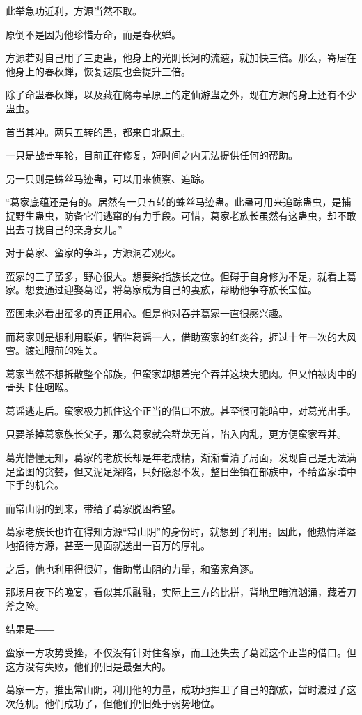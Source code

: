 \begin{this_body}
此举急功近利，方源当然不取。

原倒不是因为他珍惜寿命，而是春秋蝉。

方源若对自己用了三更蛊，他身上的光阴长河的流速，就加快三倍。那么，寄居在他身上的春秋蝉，恢复速度也会提升三倍。

除了命蛊春秋蝉，以及藏在腐毒草原上的定仙游蛊之外，现在方源的身上还有不少蛊虫。

首当其冲。两只五转的蛊，都来自北原土。

一只是战骨车轮，目前正在修复，短时间之内无法提供任何的帮助。

另一只则是蛛丝马迹蛊，可以用来侦察、追踪。

“葛家底蕴还是有的。居然有一只五转的蛛丝马迹蛊。此蛊可用来追踪蛊虫，是捕捉野生蛊虫，防备它们逃窜的有力手段。可惜，葛家老族长虽然有这蛊虫，却不敢出去寻找自己的亲身女儿。”

对于葛家、蛮家的争斗，方源洞若观火。

蛮家的三子蛮多，野心很大。想要染指族长之位。但碍于自身修为不足，就看上葛家。想要通过迎娶葛谣，将葛家成为自己的妻族，帮助他争夺族长宝位。

蛮图未必看出蛮多的真正用心。但是他对吞并葛家一直很感兴趣。

而葛家则是想利用联姻，牺牲葛谣一人，借助蛮家的红炎谷，捱过十年一次的大风雪。渡过眼前的难关。

葛家当然不想拆散整个部族，但蛮家却想着完全吞并这块大肥肉。但又怕被肉中的骨头卡住咽喉。

葛谣逃走后。蛮家极力抓住这个正当的借口不放。甚至很可能暗中，对葛光出手。

只要杀掉葛家族长父子，那么葛家就会群龙无首，陷入内乱，更方便蛮家吞并。

葛光懵懂无知，葛家的老族长却是年老成精，渐渐看清了局面，发现自己是无法满足蛮图的贪婪，但又泥足深陷，只好隐忍不发，整日坐镇在部族中，不给蛮家暗中下手的机会。

而常山阴的到来，带给了葛家脱困希望。

葛家老族长也许在得知方源“常山阴”的身份时，就想到了利用。因此，他热情洋溢地招待方源，甚至一见面就送出一百万的厚礼。

之后，他也利用得很好，借助常山阴的力量，和蛮家角逐。

那场月夜下的晚宴，看似其乐融融，实际上三方的比拼，背地里暗流汹涌，藏着刀斧之险。

结果是――

蛮家一方攻势受挫，不仅没有针对住各家，而且还失去了葛谣这个正当的借口。但这方没有失败，他们仍旧是最强大的。

葛家一方，推出常山阴，利用他的力量，成功地捍卫了自己的部族，暂时渡过了这次危机。他们成功了，但他们仍旧处于弱势地位。


\end{this_body}
